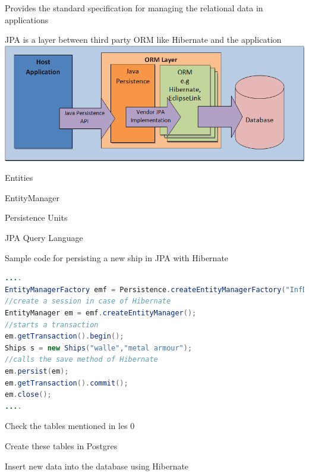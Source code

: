 \documentclass{beamer}
\begin{document}
\begin{slide}{
\item Provides the standard specification for managing the relational data in applications
\item JPA is a layer between third party ORM like Hibernate and the application 
\\
\includegraphics[scale=0.3]{img/JPA.png}
}
\end{slide} 
 
\begin{slide}{
\item Entities
\item EntityManager
\item Persistence Units
\item JPA Query Language
}
\end{slide}  

\begin{frame}[fragile]
Sample code for persisting a new ship in JPA with Hibernate 
\begin{lstlisting}[language=java]
....	 
EntityManagerFactory emf = Persistence.createEntityManagerFactory("InfDev5PU");
//create a session in case of Hibernate
EntityManager em = emf.createEntityManager();
//starts a transaction 
em.getTransaction().begin();
Ships s = new Ships("walle","metal armour");
//calls the save method of Hibernate
em.persist(em);
em.getTransaction().commit();
em.close();
....
\end{lstlisting} 
\end{frame} 
 
\begin{slide}{
\item Check the tables mentioned in les 0
\item Create these tables in Postgres
\item Insert new data into the database using Hibernate	
	}
\end{slide}
\end{document}
